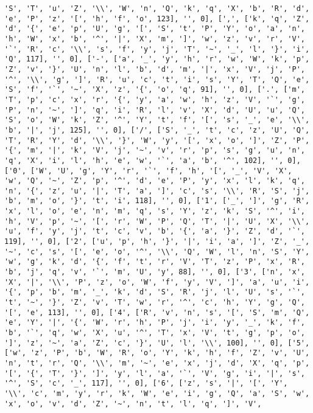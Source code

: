 \documentclass{article}
\begin{document}
\begin{verbatim}
'S', 'T', 'u', 'Z', '\\', 'W', 'n', 'Q', 'k', 'q', 'X', 'b', 'R', 'd', 'e', 'P', 'z', '[', 'h', 'f', 'o', 123], '', 0], [',', ['k', 'q', 'Z', 'd', '{', 'e', 'p', 'U', 'g', '[', 'S', 't', 'P', 'Y', 'o', 'a', 'n', 'h', 'W', 'x', 'b', '^', '|', 'X', 'm', ']', 'w', 'z', 'v', 'r', 'V', '`', 'R', 'c', '\\', 's', 'f', 'y', 'j', 'T', '~', '_', 'l', '}', 'i', 'Q', 117], '', 0], ['-', ['a', '_', 'y', 'h', 'r', 'w', 'W', 'k', 'p', 'Z', 'v', '}', 'U', 'n', 'l', 'b', 'd', 'm', '|', 'x', 'V', 'j', 'P', '^', '\\', 'g', ']', 'R', 'u', 'c', 't', 'i', 's', 'Y', 'T', 'Q', 'e', 'S', 'f', '`', '~', 'X', 'z', '{', 'o', 'q', 91], '', 0], ['.', ['m', 'T', 'p', 'c', 'x', 'r', '{', 'y', 'a', 'w', 'h', 'z', 'V', '`', 'g', 'P', 'n', '~', ']', 'q', 'i', 'R', 'l', 'v', 'X', 'd', 'U', 'u', 'Q', 'S', 'o', 'W', 'k', 'Z', '^', 'Y', 't', 'f', '[', 's', '_', 'e', '\\', 'b', '|', 'j', 125], '', 0], ['/', ['S', '_', 't', 'c', 'z', 'U', 'Q', 'T', 'R', 'Y', 'd', '\\', '}', 'W', 'y', '[', 'x', 'o', ']', 'Z', 'P', '{', 'm', '|', 'k', 'V', 'j', '~', 'v', 'r', 'p', 's', 'g', 'u', 'n', 'q', 'X', 'i', 'l', 'h', 'e', 'w', '`', 'a', 'b', '^', 102], '', 0], ['0', ['W', 'U', 'g', 'Y', 'r', '`', 'f', 'h', '[', '_', 'V', 'X', 'w', 'Q', '~', 'Z', 'p', '^', 'd', 'e', 'P', 'y', 'x', 'l', 'k', 'q', 'n', '{', 'z', 'u', '|', 'T', 'a', ']', 'c', 's', '\\', 'R', 'S', 'j', 'b', 'm', 'o', '}', 't', 'i', 118], '', 0], ['1', ['_', ']', 'g', 'R', 'x', 'l', 'o', 'e', 'n', 'm', 'q', 's', 'Y', 'z', 'k', 'S', '^', 'i', 'h', 'V', 'p', '~', '[', 'r', 'W', 'P', 'Q', 'T', '|', 'U', 'X', '\\', 'u', 'f', 'y', 'j', 't', 'c', 'v', 'b', '{', 'a', '}', 'Z', 'd', '`', 119], '', 0], ['2', ['u', 'p', 'h', '}', '|', 'i', 'a', ']', 'Z', '_', '~', 'c', 's', '[', 'e', 'o', '^', '\\', 'Q', 'W', 'l', 'n', 'S', 'Y', 'w', 'g', 'k', 'd', '{', 'f', 't', 'r', 'V', 'T', 'z', 'P', 'x', 'R', 'b', 'j', 'q', 'v', '`', 'm', 'U', 'y', 88], '', 0], ['3', ['n', 'x', 'X', '|', '\\', 'P', 'z', 'o', 'W', 'f', 'y', 'V', ']', 'a', 'u', 'i', '{', 'p', 'b', 'm', '_', 'k', 'd', 'S', 'R', 'j', 'l', 'U', 's', '`', 't', '~', '}', 'Z', 'v', 'T', 'w', 'r', '^', 'c', 'h', 'Y', 'g', 'Q', '[', 'e', 113], '', 0], ['4', ['R', 'v', 'n', 's', '[', 'S', 'm', 'Q', 'e', 'Y', '|', '{', 'W', 'r', 'h', 'P', 'j', 'i', 'y', '_', 'k', 'f', 'b', '`', 'q', 'w', 'X', 'u', '^', 'T', 'x', 'V', 't', 'g', 'p', 'o', ']', 'z', '~', 'a', 'Z', 'c', '}', 'U', 'l', '\\', 100], '', 0], ['5', ['w', 'z', 'P', 'b', 'W', 'R', 'o', 'Y', 'k', 'h', 'f', 'Z', 'v', 'U', 'n', 't', 'r', 'Q', '\\', 'm', '~', 'e', 'x', 'j', 'd', 'X', 'q', 'p', '[', '{', 'T', '}', ']', 'y', 'l', 'a', '`', 'V', 'g', 'i', '|', 's', '^', 'S', 'c', '_', 117], '', 0], ['6', ['z', 's', '|', '[', 'Y', '\\', 'c', 'm', 'y', 'r', 'k', 'W', 'e', 'i', 'g', 'Q', 'a', 'S', 'w', 'x', 'o', 'v', 'd', 'Z', '~', 'n', 't', 'l', 'q', ']', 'V', 
\end{verbatim}
\end{document}
